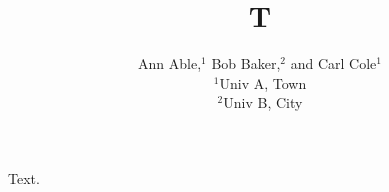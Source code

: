 \documentclass{mnras}
\title{T}
\author[A. Able et al.]{Ann Able,$^{1}$\orcidA
Bob Baker,$^{2}$\orcidB
\newauthor
and Carl Cole$^{1}$\orcidC
\\ $^{1}$Univ A, Town\\ $^{2}$Univ B, City}
\begin{document}
\maketitle
Text.
\end{document}

